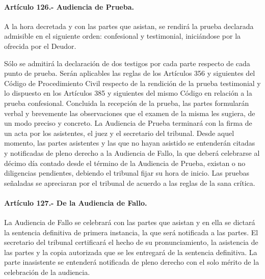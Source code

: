 \documentclass[
]{book}
\begin{document}
\hypertarget{artuxedculo-126.--audiencia-de-prueba.}{%
\paragraph*{Artículo 126.- Audiencia de Prueba.}\label{artuxedculo-126.--audiencia-de-prueba.}}

A la hora decretada y con las partes que asistan, se rendirá la prueba declarada admisible en el siguiente orden: confesional y testimonial, iniciándose por la ofrecida por el Deudor.

Sólo se admitirá la declaración de dos testigos por cada parte respecto de cada punto de prueba. Serán aplicables las reglas de los Artículos 356 y siguientes del Código de Procedimiento Civil respecto de la rendición de la prueba testimonial y lo dispuesto en los Artículos 385 y siguientes del mismo Código en relación a la prueba confesional.
Concluida la recepción de la prueba, las partes formularán verbal y brevemente las observaciones que el examen de la misma les sugiera, de un modo preciso y concreto.
La Audiencia de Prueba terminará con la firma de un acta por los asistentes, el juez y el secretario del tribunal. Desde aquel momento, las partes asistentes y las que no hayan asistido se entenderán citadas y notificadas de pleno derecho a la Audiencia de Fallo, la que deberá celebrarse al décimo día contado desde el término de la Audiencia de Prueba, existan o no diligencias pendientes, debiendo el tribunal fijar su hora de inicio.
Las pruebas señaladas se apreciaran por el tribunal de acuerdo a las reglas de la sana crítica.

\hypertarget{artuxedculo-127.--de-la-audiencia-de-fallo.}{%
\paragraph*{Artículo 127.- De la Audiencia de Fallo.}\label{artuxedculo-127.--de-la-audiencia-de-fallo.}}

La Audiencia de Fallo se celebrará con las partes que asistan y en ella se dictará la sentencia definitiva de primera instancia, la que será notificada a las partes. El secretario del tribunal certificará el hecho de su pronunciamiento, la asistencia de las partes y la copia autorizada que se les entregará de la sentencia definitiva. La parte inasistente se entenderá notificada de pleno derecho con el solo mérito de la celebración de la audiencia.
\end{document}

